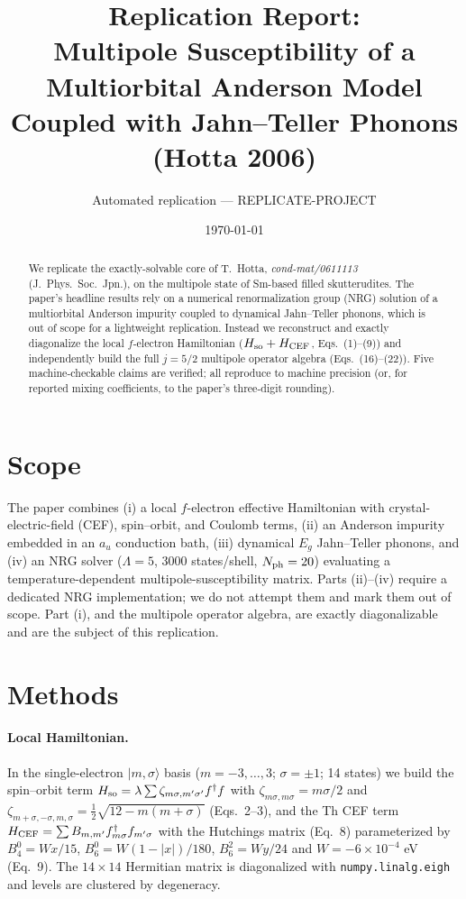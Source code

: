 \documentclass[11pt]{article}
\title{Replication Report: \\ Multipole Susceptibility of a Multiorbital Anderson Model \\ Coupled with Jahn--Teller Phonons (Hotta 2006)}
\author{Automated replication --- REPLICATE-PROJECT}
\date{\today}
\begin{document}
\maketitle

\begin{abstract}
We replicate the exactly-solvable core of T.\ Hotta, \emph{cond-mat/0611113}
(J.\ Phys.\ Soc.\ Jpn.), on the multipole state of Sm-based filled skutterudites.
The paper's headline results rely on a numerical renormalization group (NRG)
solution of a multiorbital Anderson impurity coupled to dynamical Jahn--Teller
phonons, which is out of scope for a lightweight replication. Instead we
reconstruct and exactly diagonalize the local $f$-electron Hamiltonian
($H_{\rm so}+H_{\rm CEF}$, Eqs.~(1)--(9)) and independently build the full
$j=5/2$ multipole operator algebra (Eqs.~(16)--(22)). Five machine-checkable
claims are verified; all reproduce to machine precision (or, for reported
mixing coefficients, to the paper's three-digit rounding).
\end{abstract}

\section{Scope}
The paper combines (i) a local $f$-electron effective Hamiltonian with
crystal-electric-field (CEF), spin--orbit, and Coulomb terms, (ii) an Anderson
impurity embedded in an $a_u$ conduction bath, (iii) dynamical $E_g$
Jahn--Teller phonons, and (iv) an NRG solver ($\Lambda=5$, 3000 states/shell,
$N_{\rm ph}=20$) evaluating a temperature-dependent multipole-susceptibility
matrix. Parts (ii)--(iv) require a dedicated NRG implementation; we do not
attempt them and mark them out of scope. Part (i), and the multipole operator
algebra, are exactly diagonalizable and are the subject of this replication.

\section{Methods}
\paragraph{Local Hamiltonian.} In the single-electron $|m,\sigma\rangle$ basis
($m=-3,\dots,3$; $\sigma=\pm1$; 14 states) we build the spin--orbit term
$H_{\rm so}=\lambda\sum \zeta_{m\sigma,m'\sigma'} f^\dagger f$ with
$\zeta_{m\sigma,m\sigma}=m\sigma/2$ and
$\zeta_{m+\sigma,-\sigma,m,\sigma}=\tfrac12\sqrt{12-m(m+\sigma)}$ (Eqs.~2--3),
and the Th CEF term $H_{\rm CEF}=\sum B_{m,m'} f^\dagger_{m\sigma}f_{m'\sigma}$
with the Hutchings matrix (Eq.~8) parameterized by $B_4^0=Wx/15$,
$B_6^0=W(1-|x|)/180$, $B_6^2=Wy/24$ and $W=-6\times10^{-4}$ eV (Eq.~9). The
$14\times14$ Hermitian matrix is diagonalized with \texttt{numpy.linalg.eigh}
and levels are clustered by degeneracy.
\end{document}
